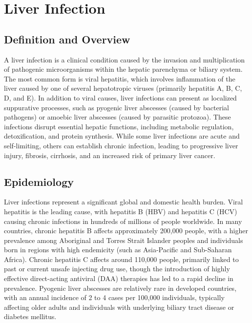 \chapter{Liver Infection}

\section*{Definition and Overview}
A liver infection is a clinical condition caused by the invasion and multiplication of pathogenic microorganisms within the hepatic parenchyma or biliary system. The most common form is viral hepatitis, which involves inflammation of the liver caused by one of several hepatotropic viruses (primarily hepatitis A, B, C, D, and E). In addition to viral causes, liver infections can present as localized suppurative processes, such as pyogenic liver abscesses (caused by bacterial pathogens) or amoebic liver abscesses (caused by parasitic protozoa). These infections disrupt essential hepatic functions, including metabolic regulation, detoxification, and protein synthesis. While some liver infections are acute and self-limiting, others can establish chronic infection, leading to progressive liver injury, fibrosis, cirrhosis, and an increased risk of primary liver cancer.

\section*{Epidemiology}
Liver infections represent a significant global and domestic health burden. Viral hepatitis is the leading cause, with hepatitis B (HBV) and hepatitis C (HCV) causing chronic infections in hundreds of millions of people worldwide. In many countries, chronic hepatitis B affects approximately 200,000 people, with a higher prevalence among Aboriginal and Torres Strait Islander peoples and individuals born in regions with high endemicity (such as Asia-Pacific and Sub-Saharan Africa). Chronic hepatitis C affects around 110,000 people, primarily linked to past or current unsafe injecting drug use, though the introduction of highly effective direct-acting antiviral (DAA) therapies has led to a rapid decline in prevalence. Pyogenic liver abscesses are relatively rare in developed countries, with an annual incidence of 2 to 4 cases per 100,000 individuals, typically affecting older adults and individuals with underlying biliary tract disease or diabetes mellitus.

